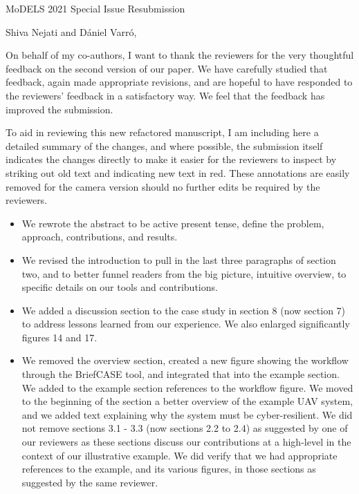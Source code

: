 \documentclass[10pt]{byu-cs}
\begin{document}
\pagestyle{headings}

\signature{Eric G Mercer\\
           Associate Professor}

\begin{letter}{MoDELS 2021 Special Issue Resubmission}

\date{\today}

\opening{Shiva Nejati and D\'{a}niel Varr\'{o},}

On behalf of my co-authors, I want to thank the reviewers for the very thoughtful feedback on the second version of our paper.
We have carefully studied that feedback, again made appropriate revisions, and are hopeful to have responded to the reviewers' feedback in a satisfactory way.
We feel that the feedback has improved the submission.

To aid in reviewing this new refactored manuscript, I am including here a detailed summary of the changes, and where possible, the submission itself indicates the changes directly to make it easier for the reviewers to inspect by striking out old text and indicating new text in red. These annotations are easily removed for the camera version should no further edits be required by the reviewers. 
\begin{itemize}
  \item We rewrote the abstract to be active present tense, define the problem, approach, contributions, and results.
  \item We revised the introduction to pull in the last three paragraphs of section two, and to better funnel readers from the big picture, intuitive overview, to specific details on our tools and contributions. 
  \item We added a discussion section to the case study in section 8 (now section 7) to address lessons learned from our experience. We also enlarged significantly figures 14 and 17.
  \item We removed the overview section, created a new figure showing the workflow through the BriefCASE tool, and integrated that into the example section. We added to the example section references to the workflow figure. We moved to the beginning of the section a better overview of the example UAV system, and we added text explaining why the system must be cyber-resilient. We did not remove sections 3.1 - 3.3 (now sections 2.2 to 2.4) as suggested by one of our reviewers as these sections discuss our contributions at a high-level in the context of our illustrative example. We did verify that we had appropriate references to the example, and its various figures, in those sections as suggested by the same reviewer.

\end{itemize}
\end{letter}
\end{document}
